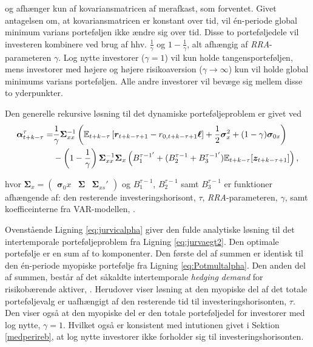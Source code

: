 \documentclass[
  a4paper,
  oneside]{memoir}
\begin{document}
og afhænger kun af kovariansmatricen af merafkast, som forventet. Givet antagelsen om, at kovariansmatricen er konstant over tid, vil én-periode global minimum varians porteføljen ikke ændre sig over tid. Disse to porteføljedele vil investeren kombinere ved brug af hhv. \(\tfrac{1}{\gamma}\) og \(1-\tfrac{1}{\gamma}\), alt afhængig af \emph{RRA}-parameteren \(\gamma\). Log nytte investorer (\(\gamma=1\)) vil kun holde tangensporteføljen, mens investorer med højere og højere risikoaversion (\(\gamma\to\infty\)) kun vil holde global minimums varians porteføljen. Alle andre investorer vil bevæge sig mellem disse to yderpunkter.

Den generelle rekursive løsning til det dynamiske porteføljeproblem er givet ved
\begin{align}
\bm{\alpha}_{t+k-\tau}^\tau = &\frac{1}{\gamma} \bm{\Sigma}_{xx}^{-1} \left( \mathbb{E}_{t+k-\tau} \left[ \bm{r}_{t+k-\tau+1} - r_{0,t+k-\tau+1} \bm{\ell} \right] + \frac{1}{2} \bm{\sigma}_x^2 + (1-\gamma) \bm{\sigma}_{0x} \right) \notag\\
&- \left(1-\frac{1}{\gamma} \right) \bm{\Sigma}_{xx}^{-1} \bm{\Sigma}_x \left(B_1^{\tau-1'}+(B_2^{\tau-1}+B_3^{\tau-1'})\mathbb{E}_{t+k-\tau}[\bm{z}_{t+k-\tau+1}]\right),\label{eq:jurvicalpha}
\end{align}

hvor \(\bm{\Sigma}_x=\begin{pmatrix}\bm{\sigma}_0x & \bm{\Sigma} & \bm{\Sigma}_{xs}'\end{pmatrix}\) og \(B_1^{\tau-1}\), \(B_2^{\tau-1}\) samt \(B_3^{\tau-1}\) er funktioner afhængende af: den resterende investeringshorisont, \(\tau\), \emph{RRA}-parameteren, \(\gamma\), samt koefficeinterne fra VAR-modellen, \citep{JurVic2011}.

Ovenstående Ligning \eqref{eq:jurvicalpha} giver den fulde analytiske løsning til det intertemporale porteføljeproblem fra Ligning \eqref{eq:jurvaegt2}. Den optimale portefølje er en sum af to komponenter. Den første del af summen er identisk til den én-periode myopiske portefølje fra Ligning \eqref{eq:Potmultalpha}. Den anden del af summen, består af det såkaldte intertemporale \emph{hedging demand} for risikobærende aktiver, \citep{Merton1969, Merton1971, Merton1973}. Herudover viser løsning at den myopiske del af det totale porteføljevalg er uafhængigt af den resterende tid til investeringshorisonten, \(\tau\). Den viser også at den myopiske del er den totale porteføljedel for investorer med log nytte, \(\gamma=1\). Hvilket også er konsistent med intutionen givet i Sektion \ref{medperireb}, at log nytte investorer ikke forholder sig til investeringshorisonten.
\end{document}
